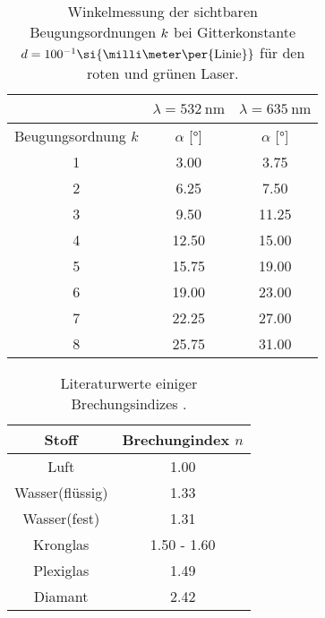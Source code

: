 \begin{table}
    \centering
    \caption{Winkelmessung der sichtbaren Beugungsordnungen $\protect k$ bei Gitterkonstante $\protect d = {100^{-1}}\si{\milli\meter\per{\text{Linie}}}$ für den roten und grünen Laser.}
    \label{tab:100linien}
    \begin{tabular}{c || c | c }
        \multicolumn{1}{c}{~} &\multicolumn{1}{c}{$\lambda = \SI{532}{\nano\meter}$} & \multicolumn{1}{c}{$\lambda = \SI{635}{\nano\meter}$} \\
        \midrule
        Beugungsordnung $k$  & $\alpha$ [$\si{\degree}$]  & $\alpha$ [$\si{\degree}$] \\
        \midrule
        1    &    3.00    & 3.75 \\ 
        2    &    6.25    & 7.50 \\ 
        3    &    9.50    & 11.25 \\ 
        4    &   12.50    & 15.00 \\
        5    &   15.75    & 19.00 \\
        6    &   19.00    & 23.00 \\
        7    &   22.25    & 27.00 \\
        8    &   25.75    & 31.00 \\
        \bottomrule
    \end{tabular}
\end{table}

\begin{table}
    \caption{Literaturwerte einiger Brechungsindizes \cite{lit2} \cite{lit3}.}
    \centering
    \label{tab:litindex}
    \begin{tabular}{c c}
        \toprule
        Stoff & Brechungindex $n$\\
        \midrule
        Luft  &  1.00    \\
        Wasser(flüssig)  &  1.33    \\
        Wasser(fest)  &  1.31    \\
        Kronglas  &   1.50 - 1.60   \\
        Plexiglas  &   1.49   \\
        Diamant     &  2.42  \\
        \bottomrule    
    \end{tabular}
\end{table}


